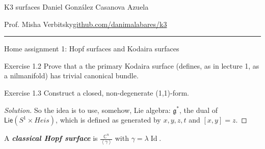 
\setcounter{secnumdepth}{2}



\begin{minipage}{\textwidth}
	\begin{minipage}{1\textwidth}
		K3 surfaces \hfill Daniel González Casanova Azuela
		
		{\small Prof. Misha Verbitsky\hfill\href{https://github.com/danimalabares/k3}{github.com/danimalabares/k3}}
	\end{minipage}
\end{minipage}\vspace{.2cm}\hrule

\vspace{10pt}
{\huge Home assignment 1: Hopf surfaces and Kodaira surfaces}

\begin{thing4}{Exercise 1.2}\label{exer:1.2}\leavevmode
Prove that a the primary Kodaira surface (defines, as in lecture 1, as a nilmanifold) has trivial canonical bundle.
\end{thing4}

\begin{thing4}{Exercise 1.3}\label{exer:1.3}\leavevmode
Construct a closed, non-degenerate (1,1)-form.
\end{thing4}

\begin{proof}[Solution]\leavevmode
	So the idea is to use, somehow, Lie algebra: \(\mathfrak{g}^*\), the dual of \(\mathsf{Lie}(S^1 \times Heis)\), which is defined as generated by \(x,y,z,t\) and  \([x,y]=z\).
\end{proof}

\begin{defn}\leavevmode
	A \textit{\textbf{classical Hopf surface}} is \(\frac{\mathbb{C}^n}{\left<\gamma\right>}\) with %
	\(\gamma=\lambda \operatorname{Id}\).

\end{defn}

